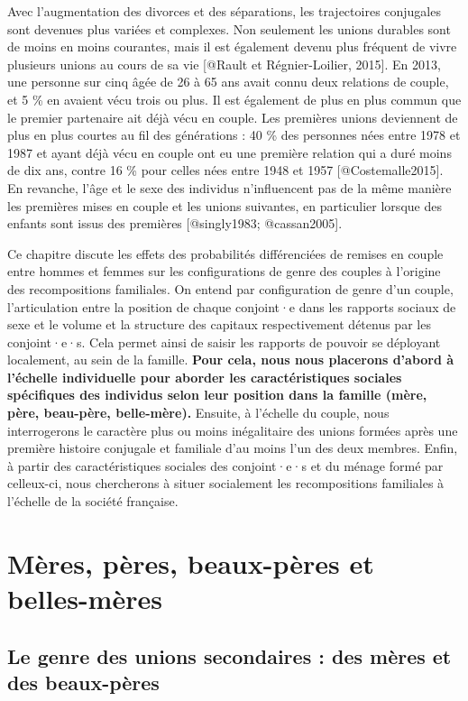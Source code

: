 \documentclass[
  12pt,
]{book}
\begin{document}
Avec l'augmentation des divorces et des séparations, les trajectoires
conjugales sont devenues plus variées et complexes. Non seulement les
unions durables sont de moins en moins courantes, mais il est également
devenu plus fréquent de vivre plusieurs unions au cours de sa vie
{[}@Rault et Régnier-Loilier, 2015{]}. En 2013, une personne sur cinq
âgée de 26 à 65 ans avait connu deux relations de couple, et 5 \% en
avaient vécu trois ou plus. Il est également de plus en plus commun que
le premier partenaire ait déjà vécu en couple. Les premières unions
deviennent de plus en plus courtes au fil des générations : 40 \% des
personnes nées entre 1978 et 1987 et ayant déjà vécu en couple ont eu
une première relation qui a duré moins de dix ans, contre 16 \% pour
celles nées entre 1948 et 1957 {[}@Costemalle2015{]}. En revanche, l'âge
et le sexe des individus n'influencent pas de la même manière les
premières mises en couple et les unions suivantes, en particulier
lorsque des enfants sont issus des premières {[}@singly1983;
@cassan2005{]}.

Ce chapitre discute les effets des probabilités différenciées de remises
en couple entre hommes et femmes sur les configurations de genre des
couples à l'origine des recompositions familiales. On entend par
configuration de genre d'un couple, l'articulation entre la position de
chaque conjoint·e dans les rapports sociaux de sexe et le volume et la
structure des capitaux respectivement détenus par les conjoint·e·s. Cela
permet ainsi de saisir les rapports de pouvoir se déployant localement,
au sein de la famille. \textbf{Pour cela, nous nous placerons d'abord à
l'échelle individuelle pour aborder les caractéristiques sociales
spécifiques des individus selon leur position dans la famille (mère,
père, beau-père, belle-mère).} Ensuite, à l'échelle du couple, nous
interrogerons le caractère plus ou moins inégalitaire des unions formées
après une première histoire conjugale et familiale d'au moins l'un des
deux membres. Enfin, à partir des caractéristiques sociales des
conjoint·e·s et du ménage formé par celleux-ci, nous chercherons à
situer socialement les recompositions familiales à l'échelle de la
société française.

\section{Mères, pères, beaux-pères et
belles-mères}\label{muxe8res-puxe8res-beaux-puxe8res-et-belles-muxe8res}

\subsection{Le genre des unions secondaires : des mères et des
beaux-pères}\label{le-genre-des-unions-secondaires-des-muxe8res-et-des-beaux-puxe8res}
\end{document}
